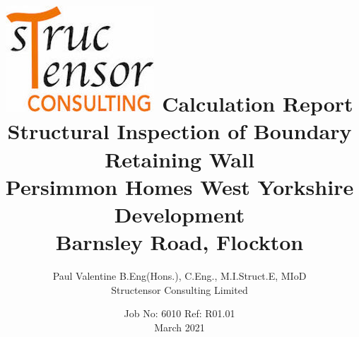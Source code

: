 \renewcommand{\baselinestretch}{1}
\usepackage{lastpage}
\usepackage{fancyhdr}
\pagestyle{fancy}
\fancyhf{}
\renewcommand{\headrulewidth}{0pt} 
\geometry{a4paper,left=25mm, top=20mm}
\author{Paul Valentine B.Eng(Hons.), C.Eng., M.I.Struct.E, MIoD \\ Structensor Consulting Limited}
\title{\includegraphics[scale=0.50]{../images/structensor_logo}\bigbreak
\textbf{Calculation Report}\\ \bigbreak 
Structural Inspection of Boundary Retaining Wall \\
Persimmon Homes West Yorkshire Development \\
Barnsley Road, Flockton
\bigbreak}
\date{Job No: 6010 Ref: R01.01\\March 2021}
